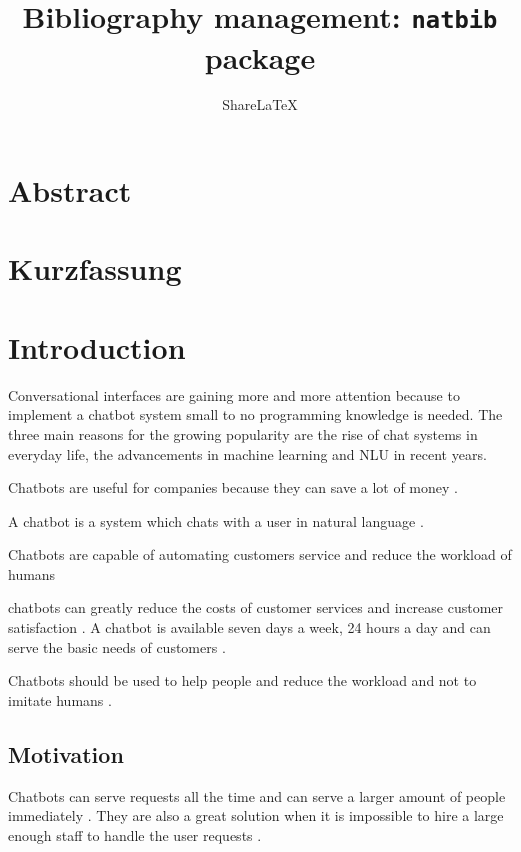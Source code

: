 \documentclass[12pt, backref]{report}
\title{Bibliography management: \texttt{natbib} package}
\author{Share\LaTeX}
\date{}
\begin{document}
	

\tableofcontents
	

\chapter*{Abstract}


\chapter*{Kurzfassung}


	\chapter{Introduction}
Conversational interfaces are gaining more and more attention because to implement a chatbot system small to no programming knowledge is needed. \cite{braunEvaluatingNLU}
The three main reasons for the growing popularity are the rise of chat systems in everyday life, the advancements in machine learning and NLU in recent years. \cite{braunEvaluatingNLU}

Chatbots are useful for companies because they can save a lot of money \cite{rahman2017programming}.

A chatbot is a system which chats with a user in natural language \cite{evaluateChatbotsShawar2007}.

Chatbots are capable of automating customers service and reduce the workload of humans \cite{deshpande2017survey}

chatbots can greatly reduce the costs of customer services and increase customer satisfaction \cite{singhbuilding}. 
A chatbot is available seven days a week, 24 hours a day and can serve the basic needs of customers \cite{singhbuilding}.

Chatbots should be used to help people and reduce the workload and not to imitate humans \cite{shawar2007chatbots}.

\section{Motivation}
Chatbots can serve requests all the time and can serve a larger amount of people immediately \cite{kane2016role}.
They are also a great solution when it is impossible to hire a large enough staff to handle the user requests \cite{kane2016role}.
\end{document}
